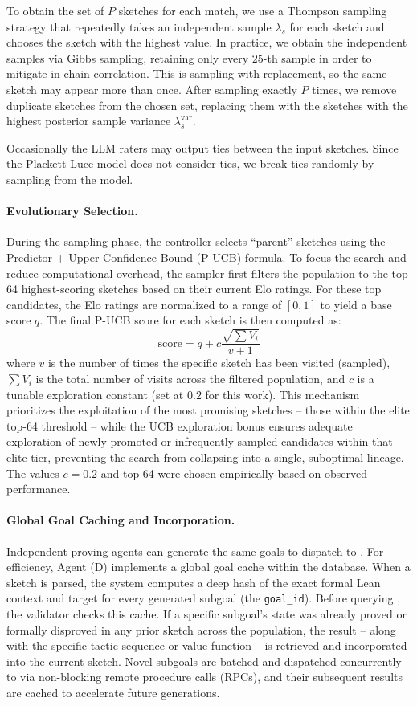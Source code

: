To obtain the set of $P$ sketches for each match, we use a Thompson sampling strategy that repeatedly takes an independent sample $\lambda_s$ for each sketch and chooses the sketch with the highest value. In practice, we obtain the independent samples via Gibbs sampling, retaining only every $25$-th sample in order to mitigate in-chain correlation. This is sampling with replacement, so the same sketch may appear more than once. After sampling exactly $P$ times, we remove duplicate sketches from the chosen set, replacing them with the sketches with the highest posterior sample variance $\lambda_s^{\textrm{var}}$.

Occasionally the LLM raters may output ties between the input sketches. Since the Plackett-Luce model does not consider ties, we break ties randomly by sampling from the model.

\paragraph{Evolutionary Selection.}
During the sampling phase, the controller selects ``parent'' sketches using the Predictor + Upper Confidence Bound (P-UCB) formula. To focus the search and reduce computational overhead, the sampler first filters the population to the top 64 highest-scoring sketches based on their current Elo ratings. For these top candidates, the Elo ratings are normalized to a range of $[0, 1]$ to yield a base score $q$. The final P-UCB score for each sketch is then computed as:
\[
\text{score} = q + c \frac{\sqrt{\sum V_i}}{v + 1}
\]
where $v$ is the number of times the specific sketch has been visited (sampled), $\sum V_i$ is the total number of visits across the filtered population, and $c$ is a tunable exploration constant (set at $0.2$ for this work). This mechanism prioritizes the exploitation of the most promising sketches -- those within the elite top-64 threshold -- while the UCB exploration bonus ensures adequate exploration of newly promoted or infrequently sampled candidates within that elite tier, preventing the search from collapsing into a single, suboptimal lineage. The values $c=0.2$ and top-64 were chosen empirically based on observed performance. 

\paragraph{Global Goal Caching and Incorporation.}
Independent proving agents can generate the same goals to dispatch to {\AP}. For efficiency, Agent (D) implements a global goal cache within the database. When a sketch is parsed, the system computes a deep hash of the exact formal Lean context and target for every generated subgoal (the \texttt{goal\_id}). Before querying {\AP}, the validator checks this cache. If a specific subgoal's state was already proved or formally disproved in any prior sketch across the population, the result -- along with the specific tactic sequence or value function -- is retrieved and incorporated into the current sketch. Novel subgoals are batched and dispatched concurrently to {\AP} via non-blocking remote procedure calls (RPCs), and their subsequent results are cached to accelerate future generations.


